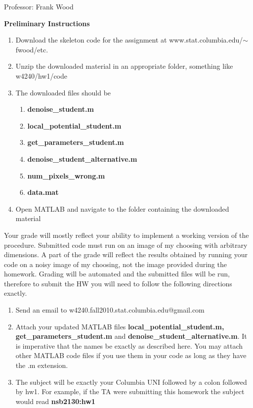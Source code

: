 \documentclass[12pt]{article}
\begin{document}

\begin{center}
	Professor: Frank Wood
\end{center}


{\bf Preliminary Instructions}
\begin{enumerate}
	\item Download the skeleton code for the assignment at www.stat.columbia.edu/$\sim$fwood/etc.
	\item Unzip the downloaded material in an appropriate folder, something like w4240/hw1/code
	\item { The downloaded files should be
		 \begin{enumerate}
			\item {\bf denoise\_student.m}
			\item {\bf local\_potential\_student.m}
			\item {\bf get\_parameters\_student.m}
			\item {\bf denoise\_student\_alternative.m}
			\item{\bf num\_pixels\_wrong.m}
			\item {\bf data.mat}
		\end{enumerate}
	}
	\item Open MATLAB and navigate to the folder containing the downloaded material
\end{enumerate}

Your grade will mostly reflect your ability to implement a working version of the procedure.  Submitted code must run on an image of my choosing with arbitrary dimensions.  A part of the grade will reflect the results obtained by running your code on a noisy image of my choosing, not the image provided during the homework.  Grading will be automated and the submitted files will be run, therefore to submit the HW you will need to follow the following directions exactly.

\begin{enumerate}
	\item Send an email to w4240.fall2010.stat.columbia.edu@gmail.com
	\item Attach your updated MATLAB files {\bf local\_potential\_student.m, get\_parameters\_student.m} and {\bf denoise\_student\_alternative.m}.  It is imperative that the names be exactly as described here.  You may attach other MATLAB code files if you use them in your code as long as they have the .m extension.
	\item The subject will be exactly your Columbia UNI followed by a colon followed by hw1.  For example, if the TA were submitting this homework the subject would read {\bf nsb2130:hw1}
\end{enumerate}
\end{document}
